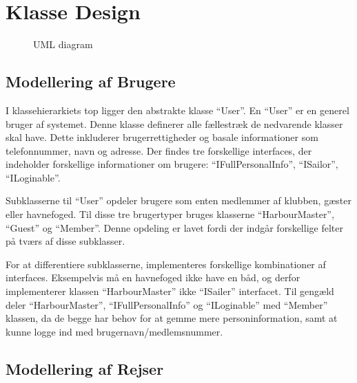 \section{Klasse Design}
\label{sec:klasse_design}



\begin{figure}
 \vspace*{-2cm}
  \centering
{}
 	\caption{UML diagram} 	\label{fig:UML}
\end{figure}


\label{sub:uml_diagram}

\subsection{Modellering af Brugere}
\label{sub:brugere_af_programmet}

I klassehierarkiets top ligger den abstrakte klasse \enquote{User}. En \enquote{User} er en generel bruger af systemet. Denne klasse definerer alle fællestræk de nedvarende klasser skal have. Dette inkluderer brugerrettigheder og basale informationer som telefonnummer, navn og adresse. Der findes tre forskellige interfaces, der indeholder forskellige informationer om brugere: \enquote{IFullPersonalInfo}, \enquote{ISailor}, \enquote{ILoginable}.

Subklasserne til \enquote{User} opdeler brugere som enten medlemmer af klubben, gæster eller havnefoged. Til disse tre brugertyper bruges klasserne \enquote{HarbourMaster}, \enquote{Guest} og \enquote{Member}. Denne opdeling er lavet fordi der indgår forskellige felter på tværs af disse subklasser. 


For at differentiere subklasserne, implementeres forskellige kombinationer af interfaces. Eksempelvis må en havnefoged ikke have en båd, og derfor implementerer klassen \enquote{HarbourMaster} ikke \enquote{ISailer} interfacet. Til gengæld deler \enquote{HarbourMaster}, \enquote{IFullPersonalInfo} og \enquote{ILoginable} med \enquote{Member} klassen, da de begge har behov for at gemme mere personinformation, samt at kunne logge ind med brugernavn/medlemsnummer.

\subsection{Modellering af Rejser}
\label{sub:rejser}

